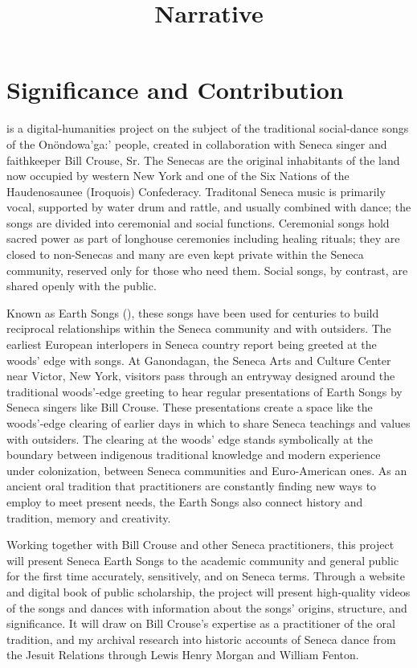 \documentclass{neh}
\title{Narrative}
\begin{document}
\maketitle
\section{Significance and Contribution}
 is a digital-humanities project
on the subject of the traditional social-dance songs of the Onöndowa’ga:’
people, created in collaboration with Seneca singer and faithkeeper Bill
Crouse, Sr.
The Senecas are the original inhabitants of the land now occupied by western
New York and one of the Six Nations of the Haudenosaunee (Iroquois)
Confederacy.
Traditonal Seneca music is primarily vocal, supported by water drum and
rattle, and usually combined with dance; the songs are divided into ceremonial
and social functions.
Ceremonial songs hold sacred power as part of longhouse ceremonies including
healing rituals; they are closed to non-Senecas and many are even kept private
within the Seneca community, reserved only for those who need them.
Social songs, by contrast, are shared openly with the public.

Known as Earth Songs (), these songs have been used
for centuries to build reciprocal relationships within the Seneca community
and with outsiders.
The earliest European interlopers in Seneca country report being greeted at
the woods' edge with songs.
At Ganondagan, the Seneca Arts and Culture Center near Victor, New York,
visitors pass through an entryway designed around the traditional woods'-edge
greeting to hear regular presentations of Earth Songs by Seneca singers like
Bill Crouse.
These presentations create a space like the woods'-edge clearing of earlier
days in which to share Seneca teachings and values with outsiders.
The clearing at the woods' edge stands symbolically at the boundary between
indigenous traditional knowledge and modern experience under colonization,
between Seneca communities and Euro-American ones.
As an ancient oral tradition that practitioners are constantly finding new
ways to employ to meet present needs, the Earth Songs also connect history and
tradition, memory and creativity.

Working together with Bill Crouse and other Seneca practitioners, this project
will present Seneca Earth Songs to the academic community and general public
for the first time accurately, sensitively, and on Seneca terms.
Through a website and digital book of public scholarship, the project will
present high-quality videos of the songs and dances with information about
the songs' origins, structure, and significance.
It will draw on Bill Crouse's expertise as a practitioner of the oral
tradition, and my archival research into historic accounts of Seneca dance
from the Jesuit Relations through Lewis Henry Morgan and William Fenton.
\end{document}
